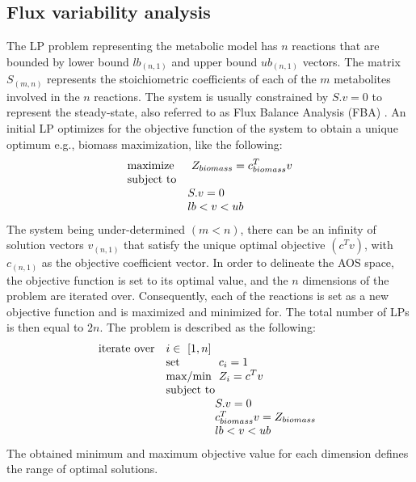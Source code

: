 \subsection{Flux variability analysis}
The LP problem representing the metabolic model has $n$ reactions that are bounded by lower bound $lb_{(n,1)}$ and upper bound $ub_{(n,1)}$ vectors.  The matrix $S_{(m,n)}$ represents the stoichiometric coefficients of each of the $m$ metabolites involved in the $n$ reactions. The system is usually constrained by $S.v=0$ to represent the steady-state, also referred to as Flux Balance Analysis (FBA) \cite{orth2010flux}. An initial LP optimizes for the objective function of the system to obtain a unique optimum e.g., biomass maximization, like the following:
\begin{equation} \label{eq:one}
\begin{array}{ll@{}ll}
\text{maximize}  & \displaystyle\ Z_{biomass}=c^{T}_{biomass}v &\\
\text{subject to}\\
& S.v=0 \\
& lb<v<ub
\end{array}
\end{equation}
The system being under-determined $(m<n)$, there can be an infinity of solution vectors $v_{(n,1)}$ that satisfy the unique optimal objective $(c^{T}v)$, with $c_{(n,1)}$ as the objective coefficient vector. In order to delineate the AOS space, the objective function is set to its optimal value, and the $n$ dimensions of the problem are iterated over. Consequently, each of the reactions is set as a new objective function and is maximized and minimized for. The total number of LPs is then equal to $2n$. The problem is described as the following:
\begin{equation} \label{eq:two}
\begin{array}{ll@{}ll@{}ll}
\text{iterate over} & i \in \displaystyle\ [1,n] &\\
& \text{set} & \displaystyle\ c_{i}=1 &\\
& \text{max/min}  & \displaystyle\ Z_{i}=c^{T}v &\\
& \text{subject to}\\
& & S.v=0 \\
& & c^{T}_{biomass}v=Z_{biomass} \\
& & lb<v<ub
\end{array}
\end{equation}
The obtained minimum and maximum objective value for each dimension defines the range of optimal solutions.
